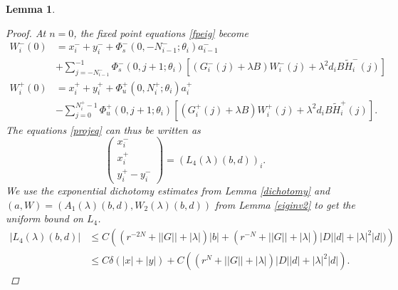 \documentclass[12pt]{elsarticle}
\newtheorem{lemma}{Lemma}
\begin{document}
\begin{lemma}
\begin{proof}
At $n = 0$, the fixed point equations \eqref{fpeig} become 
\begin{align*}
W_i^-(0) &= x_i^- + y_i^- +
\Phi_s^-(0, -N_{i-1}^-; \theta_i) a_{i-1}^- \\
&+ \sum_{j = -N_{i-1}^-}^{-1} \Phi_s^-(0, j+1; \theta_i)
[(G_i^-(j) + \lambda B) W_i^-(j) + \lambda^2 d_i B \tilde{H}_i^-(j)] \\
W_i^+(0) &= x_i^+ + y_i^+ + \Phi_u^+(0, N_i^+; \theta_i) a_i^+ \\
&- \sum_{j = 0}^{N_i^+-1} \Phi_u^+(0, j+1; \theta_i) 
[(G_i^+(j) + \lambda B) W_i^+(j) + \lambda^2 d_i B \tilde{H}_i^+(j)].
\end{align*}
The equations \eqref{projeq} can thus be written as
\begin{equation}\label{projeq2}
\begin{pmatrix}
x_i^- \\ x_i^+ \\ y_i^+ - y_i^-
\end{pmatrix}
= (L_4(\lambda)(b,d))_i.
\end{equation}
We use the exponential dichotomy estimates from Lemma \ref{dichotomy} and $(a, W) = (A_1(\lambda)(b,d), W_2(\lambda)(b,d))$ from Lemma \ref{eiginv2} to get the uniform bound on $L_4$.
\begin{align*}
|L_4(\lambda)(b,d)| 
&\leq C \left( (r^{-2N} + ||G|| + |\lambda|)|b| + 
(r^{-N} + ||G|| + |\lambda|)|D| |d| + |\lambda|^2 |d| )
\right) \\
&\leq C \delta(|x| + |y|) + C \left( (r^{N} + ||G|| + |\lambda|)|D| |d| + |\lambda|^2 |d| \right).
\end{align*}


\end{proof}
\end{lemma}
\end{document}
